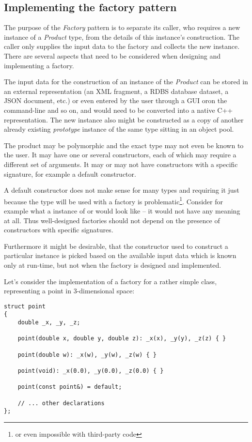 \subsection{Implementing the factory pattern}

The purpose of the {\em Factory} pattern is to separate its caller,
who requires a new instance of a {\em Product} type, from the details
of this instance's construction. The caller only supplies the input data
to the factory and collects the new instance. There are several aspects
that need to be considered when designing and implementing a factory.

The input data for the construction of an instance of the {\em Product}
can be stored in an external representation (an XML fragment, a RDBS database dataset,
a JSON document, etc.) or even entered by the user through a GUI oron the
command-line and so on, and would need to be converted into a native C++ representation.
The new instance also might be constructed as a copy of another already existing
\emph{prototype} instance of the same type sitting in an object pool.

The product may be polymorphic and the exact type may not even be
known to the user. It may have one or several constructors, each of which
may require a different set of arguments. It may or may not have
constructors with a specific signature, for example a default constructor.

A default constructor does not make sense for many types and requiring it
just because the type will be used with a factory is problematic\footnote{
or even impossible with third-party code}.
Consider for example what a  instance of \verb@person@ or \verb@address@ would
look like -- it would not have any meaning at all.
Thus well-designed factories should not depend on the presence of constructors
with specific signatures.

Furthermore it might be desirable, that the constructor used to construct
a particular instance is picked based on the available input data which is known
only at run-time, but not when the factory is designed and implemented.

Let's consider the implementation of a factory for a rather simple \verb@point@ class,
representing a point in 3-dimensional space:

\begin{verbatim}
struct point
{
    double _x, _y, _z;

    point(double x, double y, double z): _x(x), _y(y), _z(z) { }

    point(double w): _x(w), _y(w), _z(w) { }

    point(void): _x(0.0), _y(0.0), _z(0.0) { }

    point(const point&) = default;

    // ... other declarations
};
\end{verbatim}

